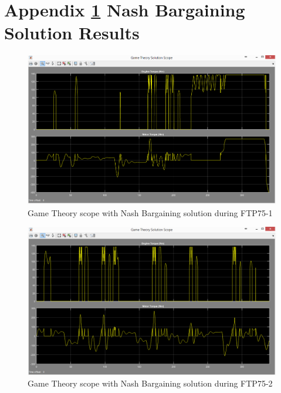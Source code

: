 \chapter{Appendix \ref{app:2} Nash Bargaining Solution Results}
\label{app:2}

\begin{figure}[h]
\centering
\includegraphics[scale=0.45]{figures/NashSolution/FTP75-1/gameTheory17Juni}
\caption{Game Theory scope with Nash Bargaining solution during FTP75-1}
\label{fig:gtns1}
\end{figure}

\begin{figure}[h]
\centering
\includegraphics[scale=0.45]{figures/NashSolution/FTP75-2/gameTheory19Juni}
\caption{Game Theory scope with Nash Bargaining solution during FTP75-2}
\label{fig:gtns2}
\end{figure}

